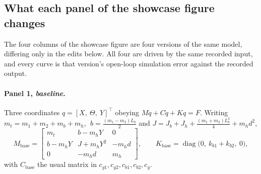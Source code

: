 %
%
%     
%

\subsection{What each panel of the showcase figure changes}
\label{sec:offset-panels}

The four columns of the showcase figure are four versions of the same model, differing only
in the edits below. All four are driven by the same recorded input, and every curve is that
version's open-loop simulation error against the recorded output.

\paragraph{Panel 1, \textit{baseline}.}
Three coordinates $q = [X,\ \Theta,\ Y]^\top$ obeying $M\ddot q + C\dot q + K q = F$. Writing
$m_t = m_1{+}m_2{+}m_b{+}m_h$, $\;b = \tfrac{(m_1-m_2)L_b}{2}$ and
$J = J_b{+}J_h{+}\tfrac{(m_1+m_2)L_b^2}{4} + m_h d^2$,
%
\begin{equation}
  M_{\mathrm{base}} =
  \begin{bmatrix}
    m_t        & b - m_h Y     & 0      \\
    b - m_h Y  & J + m_h Y^2   & -m_h d \\
    0          & -m_h d        & m_h
  \end{bmatrix},
  \qquad
  K_{\mathrm{base}} = \operatorname{diag}\bigl(0,\ k_{b1}{+}k_{b2},\ 0\bigr),
  \label{eq:panel-baseline}
\end{equation}
%
with $C_{\mathrm{base}}$ the usual matrix in $c_{g1},c_{g2},c_{b1},c_{b2},c_y$.

